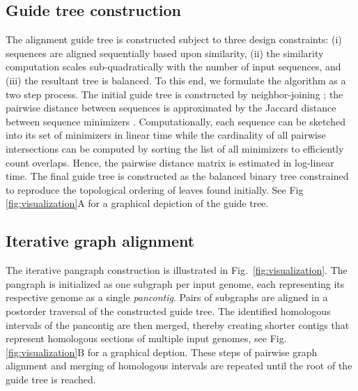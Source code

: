 \documentclass[aps,rmp,reprint,superscriptaddress,notitlepage,10pt]{revtex4-1}
\begin{document}
\subsection{Guide tree construction}
The alignment guide tree is constructed subject to three design constraints: (i) sequences are aligned sequentially based upon similarity, (ii) the similarity computation scales sub-quadratically with the number of input sequences, and (iii) the resultant tree is balanced.
To this end, we formulate the algorithm as a two step process.
The initial guide tree is constructed by neighbor-joining \cite{saitou1987neighbor}; the pairwise distance between sequences is approximated by the Jaccard distance between sequence minimizers \cite{roberts2004reducing}.
Computationally, each sequence can be sketched into its set of minimizers in linear time while the cardinality of all pairwise intersections can be computed by sorting the list of all minimizers to efficiently count overlaps.
Hence, the pairwise distance matrix is estimated in log-linear time.
The final guide tree is constructed as the balanced binary tree constrained to reproduce the topological ordering of leaves found initially.
See Fig \ref{fig:visualization}A for a graphical depiction of the guide tree.

\subsection{Iterative graph alignment}
The iterative pangraph construction is illustrated in Fig.~\ref{fig:visualization}.
The pangraph is initialized as one subgraph per input genome, each representing its respective genome as a single \emph{pancontig}.
Pairs of subgraphs are aligned in a postorder traversal of the constructed guide tree.
The identified homologous intervals of the pancontig are then merged, thereby creating shorter contigs that represent homologous sections of multiple input genomes, see Fig. \ref{fig:visualization}B for a graphical deption. 
These steps of pairwise graph alignment and merging of homologous intervals are repeated until the root of the guide tree is reached. 
\end{document}
